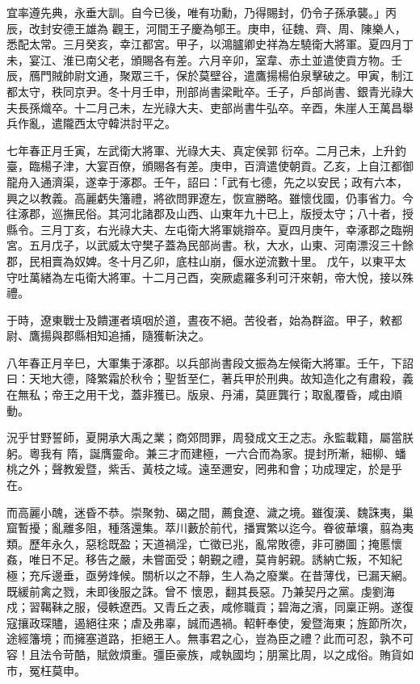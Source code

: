 \begin{pinyinscope}
 宜率遵先典，永垂大訓。自今已後，唯有功勳，乃得賜封，仍令子孫承襲。」丙辰，改封安德王雄為
 觀王，河間王子慶為郇王。庚申，征魏、齊、周、陳樂人，悉配太常。三月癸亥，幸江都宮。甲子，以鴻臚卿史祥為左驍衛大將軍。夏四月丁未，宴江、淮已南父老，頒賜各有差。六月辛卯，室韋、赤土並遣使貢方物。壬辰，鴈門賊帥尉文通，聚眾三千，保於莫壁谷，遣鷹揚楊伯泉擊破之。甲寅，制江都太守，秩同京尹。冬十月壬申，刑部尚書梁毗卒。壬子，戶部尚書、銀青光祿大夫長孫熾卒。十二月己未，左光祿大夫、吏部尚書牛弘卒。辛酉，朱崖人王萬昌舉兵作亂，遣隴西太守韓洪討平之。



 七年春正月壬寅，左武衛大將軍、光祿大夫、真定侯郭
 衍卒。二月己未，上升釣臺，臨楊子津，大宴百僚，頒賜各有差。庚申，百濟遣使朝貢。乙亥，上自江都御龍舟入通濟渠，遂幸于涿郡。壬午，詔曰：「武有七德，先之以安民；政有六本，興之以教義。高麗虧失籓禮，將欲問罪遼左，恢宣勝略。雖懷伐國，仍事省力。今往涿郡，巡撫民俗。其河北諸郡及山西、山東年九十已上，版授太守；八十者，授縣令。三月丁亥，右光祿大夫、左屯衛大將軍姚辯卒。夏四月庚午，幸涿郡之臨朔宮。五月戊子，以武威太守樊子蓋為民部尚書。秋，大水，山東、河南漂沒三十餘郡，民相賣為奴婢。冬十月乙卯，底柱山崩，偃水逆流數十里。
 戊午，以東平太守吐萬緒為左屯衛大將軍。十二月己酉，突厥處羅多利可汗來朝，帝大悅，接以殊禮。



 于時，遼東戰士及饋運者填咽於道，晝夜不絕。苦役者，始為群盜。甲子，敕都尉、鷹揚與郡縣相知追捕，隨獲斬決之。



 八年春正月辛巳，大軍集于涿郡。以兵部尚書段文振為左候衛大將軍。壬午，下詔曰：天地大德，降繁霜於秋令；聖哲至仁，著兵甲於刑典。故知造化之有肅殺，義在無私；帝王之用干戈，蓋非獲已。版泉、丹浦，莫匪龔行；取亂覆昏，咸由順動。



 況乎甘野誓師，夏開承大禹之業；商郊問罪，周發成文王之志。永監載籍，屬當朕躬。粵我有
 隋，誕膺靈命。兼三才而建極，一六合而為家。提封所漸，細柳、蟠桃之外；聲教爰暨，紫舌、黃枝之域。遠至邇安，罔弗和會；功成理定，於是乎在。



 而高麗小醜，迷昏不恭。崇聚勃、碣之間，薦食遼、濊之境。雖復漢、魏誅夷，巢窟暫擾；亂離多阻，種落還集。萃川藪於前代，播實繁以迄今。眷彼華壤，翦為夷類。歷年永久，惡稔既盈；天道禍淫，亡徵已兆，亂常敗德，非可勝圖；掩慝懷姦，唯日不足。移告之嚴，未嘗面受；朝覲之禮，莫肯躬親。誘納亡叛，不知紀極；充斥邊垂，亟勞烽候。關析以之不靜，生人為之廢業。在昔薄伐，已漏天網。既緩前禽之戮，未即後服之誅。曾不
 懷恩，翻其長惡。乃兼契丹之黨。虔劉海戍；習鞨靺之服，侵軼遼西。又青丘之表，咸修職貢；碧海之濱，同稟正朔。遂復寇攘政琛贐，遏絕往來；虐及弗辜，誠而遇禍。軺軒奉使，爰暨海東；旌節所次，途經籓境；而擁塞道路，拒絕王人。無事君之心，豈為臣之禮？此而可忍，孰不可容！且法令苛酷，賦斂煩重。彊臣豪族，咸執國均；朋黨比周，以之成俗。賄貨如市，冤枉莫申。




\end{pinyinscope}
